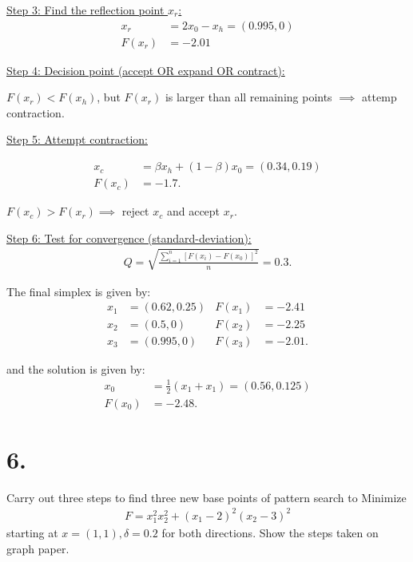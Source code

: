\documentclass{article}
\begin{document}
\qquad
\underline{Step 3: Find the reflection point $x_r$:}
\begin{align*}
  x_r    &= 2x_0 - x_h = (0.995, 0) \\
  F(x_r) &= -2.01
\end{align*}
\newline

\qquad
\underline{Step 4: Decision point (accept OR expand OR contract):}
\newline

\qquad
$F(x_r) < F(x_h)$, but $F(x_r)$ is larger than all remaining points $\implies$ attemp contraction.
\newline

\qquad
\underline{Step 5: Attempt contraction:}

\begin{align*}
  x_c    &= \beta x_h + (1-\beta) x_0 = (0.34, 0.19) \\
  F(x_c) &= -1.7.
\end{align*}

\qquad
$F(x_c) > F(x_r) \implies$ reject $x_c$ and accept $x_r$. 
\newline

\qquad
\underline{Step 6: Test for convergence (standard-deviation):}
\begin{align*}
  Q = \sqrt{\frac{\sum_{i=1}^{n}  [ F(x_i) - F(x_0) ]^2 }{n}} = 0.3.
\end{align*}
\newline

\qquad
The final simplex is given by:
\begin{align*}
  x_1 &= (0.62,0.25)   &F(x_1) &= -2.41 \\
  x_2 &= (0.5,0) &F(x_2) &= -2.25 \\
  x_3 &= (0.995,0) &F(x_3) &= -2.01.
\end{align*}

\qquad
and the solution is given by:
\begin{align*}
  x_0    &= \frac{1}{2} (x_1 + x_1) = (0.56, 0.125) \\
  F(x_0) &= -2.48.
\end{align*}
\newpage


\section*{6.}

Carry out three steps to find three new base points of pattern search to Minimize 
\begin{align*}
  F = x_1^2 x_2^2 + (x_1 - 2)^2(x_2 - 3)^2
\end{align*}
starting at $x= (1, 1), \delta=0.2$ 
for both directions. Show the steps taken on graph paper.
\end{document}
